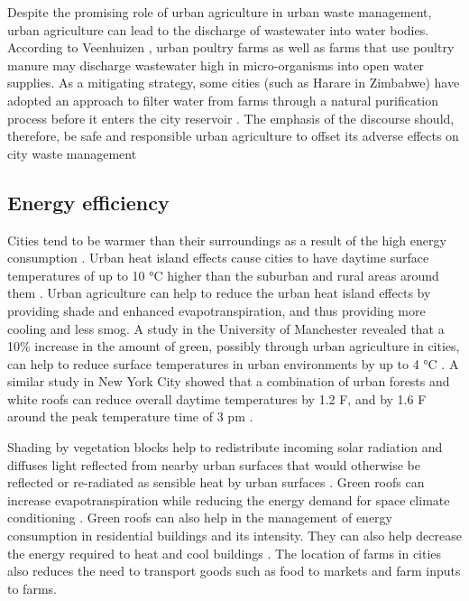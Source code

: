Despite the promising role of urban agriculture in urban waste management, urban agriculture can lead to the discharge of wastewater into water bodies. According to Veenhuizen \cite{Veenhuizen}, urban poultry farms as well as farms that use poultry manure may discharge wastewater high in micro-organisms into open water supplies. As a mitigating strategy, some cities (such as Harare in Zimbabwe) have adopted an approach to filter water from farms through a natural purification process before it enters the city reservoir \cite{Kutiwa2010}. The emphasis of the discourse should, therefore, be safe and responsible urban agriculture to offset its adverse effects on city waste management

\subsection{Energy efficiency}

Cities tend to be warmer than their surroundings as a result of the high energy consumption \cite{Heather2012}. Urban heat island effects cause cities to have daytime surface temperatures of up to 10 °C higher than the suburban and rural areas around them \cite{Voiland2010}. Urban agriculture can help to reduce the urban heat island effects by providing shade and enhanced evapotranspiration, and thus providing more cooling and less smog. A study in the University of Manchester revealed that a 10\% increase in the amount of green, possibly through urban agriculture in cities, can help to reduce surface temperatures in urban environments by up to 4 °C \cite{Gill2007}. A similar study in New York City showed that a combination of urban forests and white roofs can reduce overall daytime temperatures by 1.2 F, and by 1.6 F around the peak temperature time of 3 pm \cite{Ackerman2014}.

Shading by vegetation blocks help to redistribute incoming solar radiation and diffuses light reflected from nearby urban surfaces that would otherwise be reflected or re-radiated as sensible heat by urban surfaces \cite{RIZWAN2008}. Green roofs can increase evapotranspiration while reducing the energy demand for space climate conditioning \cite{QIU2013}. Green roofs can also help in the management of energy consumption in residential buildings and its intensity. They can also help decrease the energy required to heat and cool buildings \cite{Ackerman2014}. The location of farms in cities also reduces the need to transport goods such as food to markets and farm inputs to farms.

